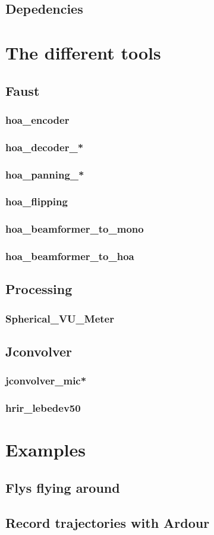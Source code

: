 \documentclass[10pt,a4paper]{article}
\begin{document}
\subsection{Depedencies}
\section{The different tools}
\subsection{Faust}
\subsubsection{hoa\_encoder}
\subsubsection{hoa\_decoder\_*}
\subsubsection{hoa\_panning\_*}
\subsubsection{hoa\_flipping}
\subsubsection{hoa\_beamformer\_to\_mono}
\subsubsection{hoa\_beamformer\_to\_hoa}
\subsection{Processing}
\subsubsection{Spherical\_VU\_Meter}
\subsection{Jconvolver}
\subsubsection{jconvolver\_mic*}
\subsubsection{hrir\_lebedev50}
\section{Examples}
\subsection{Flys flying around}
\subsection{Record trajectories with Ardour}
\end{document}
